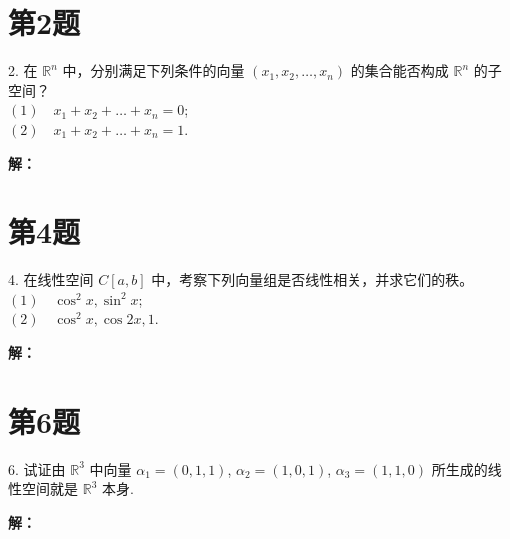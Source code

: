 \documentclass[a4paper, 12pt]{ctexart}
\begin{document}
\makeHomeworkTitle


\section*{第2题}
\begin{exercise}
2. 在 $\mathbb{R}^n$ 中，分别满足下列条件的向量 $(x_1, x_2, \dots, x_n)$ 的集合能否构成 $\mathbb{R}^n$ 的子空间？ \\
$(1) \quad x_1 + x_2 + \dots + x_n = 0$; \\
$(2) \quad x_1 + x_2 + \dots + x_n = 1$.
\end{exercise}

\noindent\textbf{解：}







\section*{第4题}
\begin{exercise}
4. 在线性空间 $C[a,b]$ 中，考察下列向量组是否线性相关，并求它们的秩。 \\
$(1) \quad \cos^2 x, \sin^2 x$; \\
$(2) \quad \cos^2 x, \cos 2x, 1$.


\end{exercise}
\noindent\textbf{解：}









\section*{第6题}
\begin{exercise}
6. 试证由 $\mathbb{R}^3$ 中向量 $\alpha_1 = (0,1,1)$, $\alpha_2 = (1,0,1)$, $\alpha_3 = (1,1,0)$ 所生成的线性空间就是 $\mathbb{R}^3$ 本身.

\end{exercise}
\noindent\textbf{解：}
\end{document}
